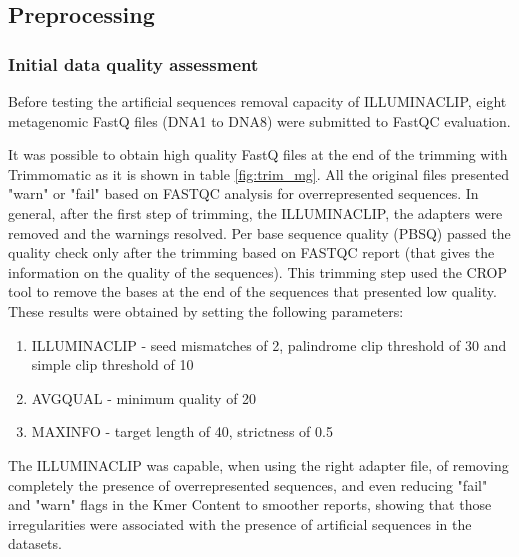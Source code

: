 \documentclass[
  oneside,
  11pt, a4paper,
  footinclude=true,
  headinclude=true,
  cleardoublepage=empty
]{scrbook}
\begin{document}
    \subsection{Preprocessing}
    
    \subsubsection{Initial data quality assessment}
    
    Before testing the artificial sequences removal capacity of ILLUMINACLIP, eight metagenomic FastQ files (DNA1 to DNA8) were submitted to FastQC evaluation.
    
    It was possible to obtain high quality FastQ files at the end of the trimming with Trimmomatic as it is shown in table \ref{fig:trim_mg}. All the original files presented "warn" or "fail" based on FASTQC analysis for overrepresented sequences. In general, after the first step of trimming, the ILLUMINACLIP, the adapters were removed and the warnings resolved. Per base sequence quality (PBSQ) passed the quality check only after the trimming based on FASTQC report (that gives the information on the quality of the sequences). This trimming step used the CROP tool to remove the bases at the end of the sequences that presented low quality. 
    These results were obtained by setting the following parameters: 
    \begin{enumerate}
        \item ILLUMINACLIP - seed mismatches of 2, palindrome clip threshold of 30 and simple clip threshold of 10
        \item AVGQUAL - minimum quality of 20
        \item MAXINFO - target length of 40, strictness of 0.5
    \end{enumerate}
    
    The ILLUMINACLIP was capable, when using the right adapter file, of removing completely the presence of overrepresented sequences, and even reducing "fail" and "warn" flags in the Kmer Content to smoother reports, showing that those irregularities were associated with the presence of artificial sequences in the datasets.
    
\end{document}
